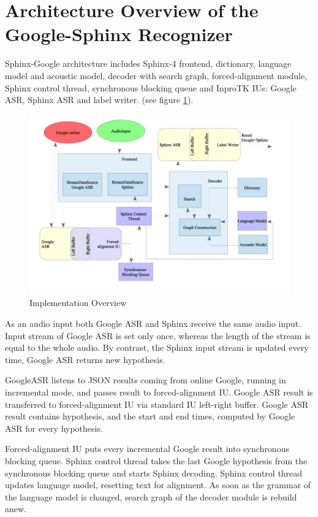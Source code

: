\section {Architecture Overview of the Google-Sphinx Recognizer}
Sphinx-Google architecture includes Sphinx-4 frontend, dictionary,
language model and acoustic model, decoder with search graph, forced-alignment
module, Sphinx control thread, synchronous blocking queue and InproTK IUs:
Google ASR, Sphinx ASR and label writer.  (see figure \ref {fig:arch}).
\begin{figure}[htbp]
  \centering
    \includegraphics[width=1\textwidth]{images/architecture.png}
 \caption{Implementation Overview}
  \label{fig:arch}
\end {figure} 

As an audio input both Google ASR and Sphinx receive the same audio input.
Input stream of Google ASR is set only once, whereas the length of
the stream is equal to the whole audio. By contrast, the Sphinx input stream is
updated every time, Google ASR returns new hypothesis.  


GoogleASR listens to JSON results coming from online Google, running
in incremental mode, and passes result to forced-alignment IU. Google ASR result
is transferred to forced-alignment IU via standard IU left-right buffer. Google
ASR result contains hypothesis, and the start and end times, computed by Google
ASR for every hypothesis. 

Forced-alignment IU puts every incremental Google result into synchronous
blocking queue. Sphinx control thread takes the last Google hypothesis from the
synchronous blocking queue and starts Sphinx decoding. Sphinx control thread
updates language model, resetting text for alignment. As soon as the grammar of
the language model is changed, search graph of the decoder module is rebuild
anew. 


